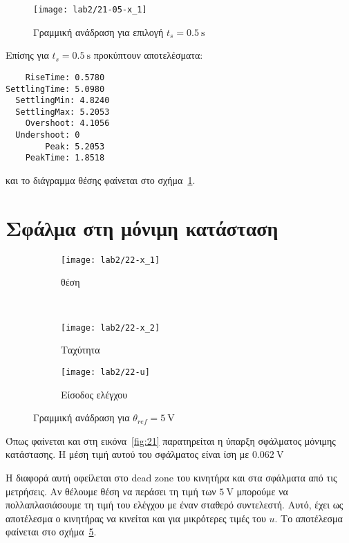 \begin{figure}[htb]
  \centering
  \texttt{[image: lab2/21-05-x\_1]}
  \caption[Γραμμική ανάδραση με μειωμένο χρόνο αποκατάστασης]{Γραμμική ανάδραση για επιλογή $t_s = \SI{0.5}{\second}$}
  \label{fig:21-05}
\end{figure}

Επίσης για $t_s = \SI{0.5}{\second}$ προκύπτουν αποτελέσματα:
\begin{code}
\begin{verbatim}
    RiseTime: 0.5780
SettlingTime: 5.0980
  SettlingMin: 4.8240
  SettlingMax: 5.2053
    Overshoot: 4.1056
  Undershoot: 0
        Peak: 5.2053
    PeakTime: 1.8518
\end{verbatim}
\end{code}
και το διάγραμμα θέσης φαίνεται στο σχήμα~\ref{fig:21-05}.

\section{Σφάλμα στη μόνιμη κατάσταση}
\begin{figure}
  \centering
  \begin{subfigure}[t]{\linewidth}
    \texttt{[image: lab2/22-x\_1]}
    \caption{θέση}
    \label{fig:22-x_1}
  \end{subfigure}\\
  \begin{subfigure}[t]{0.45\linewidth}
    \texttt{[image: lab2/22-x\_2]}
    \caption{Ταχύτητα}
    \label{fig:22-x_2}
  \end{subfigure}\hfill
  \begin{subfigure}[t]{0.45\linewidth}
    \texttt{[image: lab2/22-u]}
    \caption{Είσοδος ελέγχου}
    \label{fig:22-u}
  \end{subfigure}
  \caption[Γραμμική ανάδραση με σταθερή τάση αναφοράς]{Γραμμική ανάδραση για $\theta_{ref} = \SI{5}{\volt}$}
  \label{fig:22}
\end{figure}

Όπως φαίνεται και στη εικόνα~\ref{fig:21} παρατηρείται η ύπαρξη σφάλματος μόνιμης κατάστασης.
Η μέση τιμή αυτού του σφάλματος είναι ίση με $\SI{0.062}{\volt}$

Η διαφορά αυτή οφείλεται στο dead zone του κινητήρα και στα σφάλματα από τις μετρήσεις.
Αν θέλουμε θέση να περάσει τη τιμή των $\SI{5}{\volt}$ μπορούμε να πολλαπλασιάσουμε τη τιμή του ελέγχου με έναν σταθερό συντελεστή.
Αυτό, έχει ως αποτέλεσμα ο κινητήρας να κινείται και για μικρότερες τιμές του $u$.
Το αποτέλεσμα φαίνεται στο σχήμα~\ref{fig:22}.

